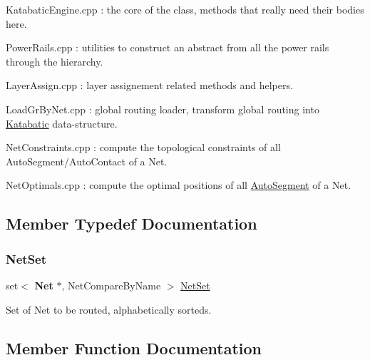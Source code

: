 \begin{DoxyItemize}
\item {\ttfamily Katabatic\+Engine.\+cpp} \+: the core of the class, methods that really need their bodies here.
\item {\ttfamily Power\+Rails.\+cpp} \+: utilities to construct an abstract from all the power rails through the hierarchy.
\item {\ttfamily Layer\+Assign.\+cpp} \+: layer assignement related methods and helpers.
\item {\ttfamily Load\+Gr\+By\+Net.\+cpp} \+: global routing loader, transform global routing into \mbox{\hyperlink{namespaceKatabatic}{Katabatic}} data-\/structure.
\item {\ttfamily Net\+Constraints.\+cpp} \+: compute the topological constraints of all Auto\+Segment/\+Auto\+Contact of a Net.
\item {\ttfamily Net\+Optimals.\+cpp} \+: compute the optimal positions of all \mbox{\hyperlink{classKatabatic_1_1AutoSegment}{Auto\+Segment}} of a Net. 
\end{DoxyItemize}

\subsection{Member Typedef Documentation}
\mbox{\label{classKatabatic_1_1KatabaticEngine_a92ed88f9aecd2f195089c4029fa8bcc7}} 
\subsubsection{\texorpdfstring{Net\+Set}{NetSet}}
{\footnotesize\ttfamily set$<$ \textbf{ Net} $\ast$, Net\+Compare\+By\+Name $>$ \mbox{\hyperlink{classKatabatic_1_1KatabaticEngine_a92ed88f9aecd2f195089c4029fa8bcc7}{Net\+Set}}}

Set of Net to be routed, alphabetically sorteds. 

\subsection{Member Function Documentation}
\mbox{\label{classKatabatic_1_1KatabaticEngine_ab877a64c314024602cfb04631ebfbfc4}} 
